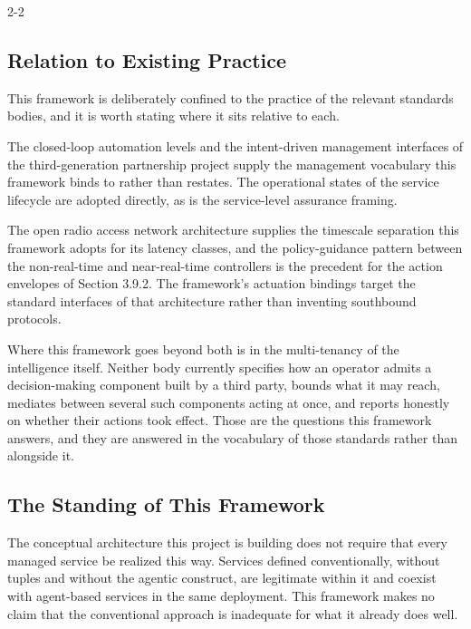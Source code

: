 \begin{wptable}{2-2}
\end{wptable}

\hypertarget{relation-to-existing-practice}{%
\subsection{Relation to Existing Practice}\label{relation-to-existing-practice}}

This framework is deliberately confined to the practice of the relevant
standards bodies, and it is worth stating where it sits relative to
each.

The closed-loop automation levels and the intent-driven management
interfaces of the third-generation partnership project supply the
management vocabulary this framework binds to rather than restates. The
operational states of the service lifecycle are adopted directly, as is
the service-level assurance framing.

The open radio access network architecture supplies the timescale
separation this framework adopts for its latency classes, and the
policy-guidance pattern between the non-real-time and near-real-time
controllers is the precedent for the action envelopes of Section 3.9.2.
The framework's actuation bindings target the standard interfaces of
that architecture rather than inventing southbound protocols.

Where this framework goes beyond both is in the multi-tenancy of the
intelligence itself. Neither body currently specifies how an operator
admits a decision-making component built by a third party, bounds what
it may reach, mediates between several such components acting at once,
and reports honestly on whether their actions took effect. Those are the
questions this framework answers, and they are answered in the
vocabulary of those standards rather than alongside it.

\hypertarget{the-standing-of-this-framework}{%
\subsection{The Standing of This Framework}\label{the-standing-of-this-framework}}

The conceptual architecture this project is building does not require
that every managed service be realized this way. Services defined
conventionally, without tuples and without the agentic construct, are
legitimate within it and coexist with agent-based services in the same
deployment. This framework makes no claim that the conventional approach
is inadequate for what it already does well.

